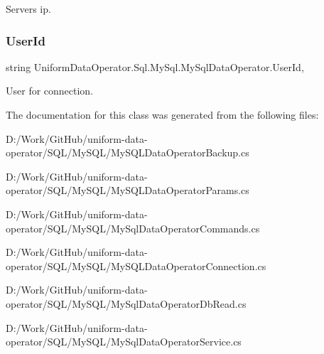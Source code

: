 Server\textquotesingle{}s ip. 

\mbox{\label{class_uniform_data_operator_1_1_sql_1_1_my_sql_1_1_my_sql_data_operator_ae5e119508a6d9807b9e138c628a6e18f}} 
\subsubsection{\texorpdfstring{User\+Id}{UserId}}
{\footnotesize\ttfamily string Uniform\+Data\+Operator.\+Sql.\+My\+Sql.\+My\+Sql\+Data\+Operator.\+User\+Id\hspace{0.3cm}{\ttfamily [get]}, {\ttfamily [set]}}



User for connection. 



The documentation for this class was generated from the following files\+:\begin{DoxyCompactItemize}
\item 
D\+:/\+Work/\+Git\+Hub/uniform-\/data-\/operator/\+S\+Q\+L/\+My\+S\+Q\+L/My\+S\+Q\+L\+Data\+Operator\+Backup.\+cs\item 
D\+:/\+Work/\+Git\+Hub/uniform-\/data-\/operator/\+S\+Q\+L/\+My\+S\+Q\+L/My\+S\+Q\+L\+Data\+Operator\+Params.\+cs\item 
D\+:/\+Work/\+Git\+Hub/uniform-\/data-\/operator/\+S\+Q\+L/\+My\+S\+Q\+L/My\+Sql\+Data\+Operator\+Commands.\+cs\item 
D\+:/\+Work/\+Git\+Hub/uniform-\/data-\/operator/\+S\+Q\+L/\+My\+S\+Q\+L/My\+S\+Q\+L\+Data\+Operator\+Connection.\+cs\item 
D\+:/\+Work/\+Git\+Hub/uniform-\/data-\/operator/\+S\+Q\+L/\+My\+S\+Q\+L/My\+Sql\+Data\+Operator\+Db\+Read.\+cs\item 
D\+:/\+Work/\+Git\+Hub/uniform-\/data-\/operator/\+S\+Q\+L/\+My\+S\+Q\+L/My\+Sql\+Data\+Operator\+Service.\+cs\end{DoxyCompactItemize}

